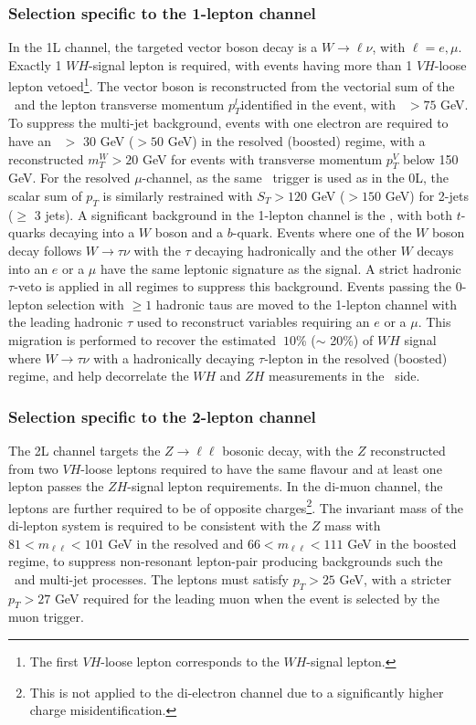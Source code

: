 \subsubsection{Selection specific to the 1-lepton channel}
In the 1L channel, the targeted vector boson decay is a $W \rightarrow \ell\nu$, with $\ell = e, \mu$. Exactly 1 $WH$-signal lepton is required, with events having more than 1 $VH$-loose lepton vetoed\footnote{The first $VH$-loose lepton corresponds to the $WH$-signal lepton.}. The vector boson is reconstructed from the vectorial sum of the \etm\ and the lepton transverse momentum $p_T^l$identified in the event, with \ptv\ $> 75$ GeV. To suppress the multi-jet background, events with one electron are required to have an \etm\ $>$ 30 GeV ($> 50$ GeV) in the resolved (boosted) regime, with a reconstructed $m_T^W > 20$ GeV for events with transverse momentum $p_T^V$ below 150 GeV. For the resolved $\mu$-channel, as the same \etm\ trigger is used as in the 0L, the scalar sum of $p_T$ is similarly restrained with $S_T > 120$ GeV ($> 150$ GeV) for 2-jets ($\geq$ 3 jets). A significant background in the 1-lepton channel is the \ttb, with both $t$-quarks decaying into a $W$ boson and a $b$-quark. Events where one of the $W$ boson decay follows $W \rightarrow \tau \nu$ with the $\tau$ decaying hadronically and the other $W$ decays into an $e$ or a $\mu$ have the same leptonic signature as the signal. A strict hadronic $\tau$-veto is applied in all regimes to suppress this background. Events passing the 0-lepton selection with $\geq 1$ hadronic taus are moved to the 1-lepton channel with the leading hadronic $\tau$ used to reconstruct variables requiring an $e$ or a $\mu$. This migration is performed to recover the estimated $~10$\% ($\sim$ 20\%) of $WH$ signal where $W\rightarrow \tau \nu$ with a hadronically decaying $\tau$-lepton in the resolved (boosted) regime, and help decorrelate the $WH$ and $ZH$ measurements in the \vhb\ side.

\subsubsection{Selection specific to the 2-lepton channel}
The 2L channel targets the $Z \rightarrow\ell\ell$ bosonic decay, with the $Z$ reconstructed from two $VH$-loose leptons required to have the same flavour and at least one lepton passes the $ZH$-signal lepton requirements. In the di-muon channel, the leptons are further required to be of opposite charges\footnote{This is not applied to the di-electron channel due to a significantly higher charge misidentification.}. The invariant mass of the di-lepton system is required to be consistent with the $Z$ mass with $81 < m_{\ell\ell} < 101$ GeV in the resolved and $66 < m_{\ell\ell} < 111$ GeV in the boosted regime, to suppress non-resonant lepton-pair producing backgrounds such the \ttb\ and multi-jet processes. The leptons must satisfy $p_T > 25$ GeV, with a stricter $p_T > 27$ GeV required for the leading muon when the event is selected by the muon trigger.

